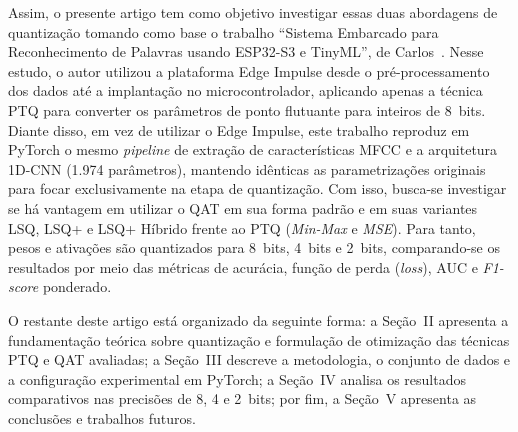 Assim, o presente artigo tem como objetivo investigar essas duas abordagens de quantização tomando como base o trabalho ``Sistema Embarcado para Reconhecimento de Palavras usando ESP32-S3 e TinyML'', de Carlos~\cite{carlos2025}. Nesse estudo, o autor utilizou a plataforma Edge Impulse desde o pré-processamento dos dados até a implantação no microcontrolador, aplicando apenas a técnica PTQ para converter os parâmetros de ponto flutuante para inteiros de 8~bits. Diante disso, em vez de utilizar o Edge Impulse, este trabalho reproduz em PyTorch o mesmo \textit{pipeline} de extração de características MFCC e a arquitetura 1D-CNN (1.974 parâmetros), mantendo idênticas as parametrizações originais para focar exclusivamente na etapa de quantização. Com isso, busca-se investigar se há vantagem em utilizar o QAT em sua forma padrão e em suas variantes LSQ, LSQ+ e LSQ+ Híbrido frente ao PTQ (\textit{Min-Max} e \textit{MSE}). Para tanto, pesos e ativações são quantizados para 8~bits, 4~bits e 2~bits, comparando-se os resultados por meio das métricas de acurácia, função de perda (\textit{loss}), AUC e \textit{F1-score} ponderado.

O restante deste artigo está organizado da seguinte forma: a Seção~II apresenta a fundamentação teórica sobre quantização e formulação de otimização das técnicas PTQ e QAT avaliadas; a Seção~III descreve a metodologia, o conjunto de dados e a configuração experimental em PyTorch; a Seção~IV analisa os resultados comparativos nas precisões de 8, 4 e 2~bits; por fim, a Seção~V apresenta as conclusões e trabalhos futuros.
